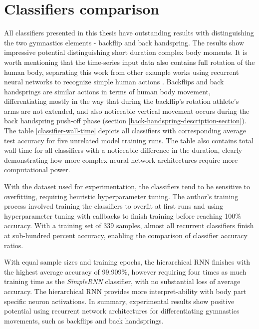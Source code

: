\begin{comment}

\end{comment}

\section{Classifiers comparison}

All classifiers presented in this thesis have outstanding results with distinguishing the two gymnastics elements - backflip and back handspring. The results show impressive potential distinguishing short duration complex body moments. It is worth mentioning that the time-series input data also contains full rotation of the human body, separating this work from other example works using recurrent neural networks to recognize simple human actions \cite{sawant2020human}. Backflips and back handsprings are similar actions in terms of human body movement, differentiating mostly in the way that during the backflip's rotation athlete's arms are not extended, and also noticeable vertical movement occurs during the back handspring push-off phase (section \ref{back-handspring-description-section}). The table \ref{classifier-wall-time} depicts all classifiers with corresponding average test accuracy for five unrelated model training runs. The table also contains total wall time for all classifiers with a noticeable difference in the duration, clearly demonstrating how more complex neural network architectures require more computational power.

With the dataset used for experimentation, the classifiers tend to be sensitive to overfitting, requiring heuristic hyperparameter tuning. The author's training process involved training the classifiers to overfit at first runs and using hyperparameter tuning with callbacks to finish training before reaching 100\% accuracy. With a training set of 339 samples, almost all recurrent classifiers finish at sub-hundred percent accuracy, enabling the comparison of classifier accuracy ratios.

With equal sample sizes and training epochs, the hierarchical RNN finishes with the highest average accuracy of 99.909\%, however requiring four times as much training time as the \textit{SimpleRNN} classifier, with no substantial loss of average accuracy. The hierarchical RNN provides more interpret-ability with body part specific neuron activations. In summary, experimental results show positive potential using recurrent network architectures for differentiating gymnastics movements, such as backflips and back handsprings. 

